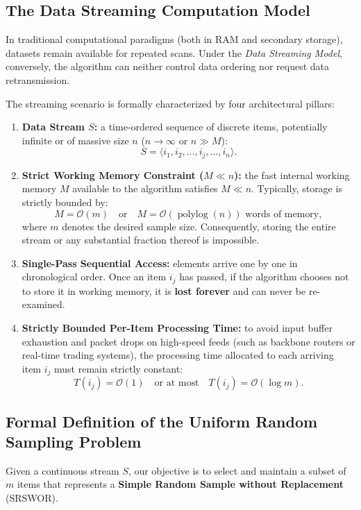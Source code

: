 \subsection{The Data Streaming Computation Model}
In traditional computational paradigms (both in RAM and secondary storage), datasets remain available for repeated scans. Under the \textit{Data Streaming Model}, conversely, the algorithm can neither control data ordering nor request data retransmission.

The streaming scenario is formally characterized by four architectural pillars:
\begin{enumerate}
  \item \textbf{Data Stream $S$:} a time-ordered sequence of discrete items, potentially infinite or of massive size $n$ ($n \to \infty$ or $n \gg M$):
  \begin{equation}
    S = \langle i_1, i_2, \dots, i_j, \dots, i_n \rangle.
  \end{equation}
  \item \textbf{Strict Working Memory Constraint ($M \ll n$):} the fast internal working memory $M$ available to the algorithm satisfies $M \ll n$. Typically, storage is strictly bounded by:
  \begin{equation}
    M = \mathcal{O}(m) \quad \text{or} \quad M = \mathcal{O}(\operatorname{polylog}(n)) \text{ words of memory},
  \end{equation}
  where $m$ denotes the desired sample size. Consequently, storing the entire stream or any substantial fraction thereof is impossible.
  \item \textbf{Single-Pass Sequential Access:} elements arrive one by one in chronological order. Once an item $i_j$ has passed, if the algorithm chooses not to store it in working memory, it is \textbf{lost forever} and can never be re-examined.
  \item \textbf{Strictly Bounded Per-Item Processing Time:} to avoid input buffer exhaustion and packet drops on high-speed feeds (such as backbone routers or real-time trading systems), the processing time allocated to each arriving item $i_j$ must remain strictly constant:
  \begin{equation}
    T(i_j) = \mathcal{O}(1) \quad \text{or at most} \quad T(i_j) = \mathcal{O}(\log m).
  \end{equation}
\end{enumerate}

\subsection{Formal Definition of the Uniform Random Sampling Problem}
Given a continuous stream $S$, our objective is to select and maintain a subset of $m$ items that represents a \textbf{Simple Random Sample without Replacement} (SRSWOR).

